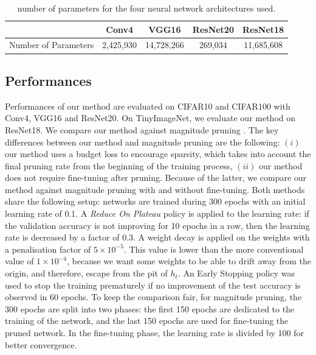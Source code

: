 \begin{table}[ht]
  \centering
  \begin{tabular}{lcccc}
  \cline{2-5}
                       & \textbf{Conv4}     & \textbf{VGG16}      & \textbf{ResNet20} & \textbf{ResNet18}   \\ \hline
  Number of Parameters & 2,425,930 & 14,728,266 & 269,034  & 11,685,608 \\ \hline
  \end{tabular}
  \caption{ number of parameters for the four neural network architectures used.}
  \label{tab:chap1:networks_size}
\end{table}


\subsection{Performances}
\label{sec:chap1:performances}
Performances of our method are evaluated on CIFAR10 and CIFAR100 with Conv4,
VGG16 and ResNet20. On TinyImageNet, we evaluate our method on ResNet18. We
compare our method against magnitude pruning \cite{DBLP:conf/nips/HanPTD15}. The
key differences between our method and magnitude pruning are the following:
$(i)$ our method uses a budget loss to encourage sparsity, which takes into
account the final pruning rate from the beginning of the training process,
$(ii)$ our method does not require fine-tuning after pruning. Because of the
latter, we compare our method against magnitude pruning with and without
fine-tuning. Both methods share the following setup: networks are trained during
300 epochs with an initial learning rate of 0.1. A {\em Reduce On Plateau}
policy is applied to the learning rate: if the validation accuracy is not
improving for 10 epochs in a row, then the learning rate is decreased by a
factor of 0.3. A weight decay is applied on the weights with a penalisation
factor of $5\times10^{−5}$. This value is lower than the more conventional value
of $1\times10^{-4}$, because we want some weights to be able to drift away from the
origin, and therefore, escape from the pit of $h_t$. An Early Stopping policy was
used to stop the training prematurely if no improvement of the test accuracy is
observed in 60 epochs. To keep the comparison fair, for magnitude pruning, the
300 epochs are split into two phases: the first 150 epochs are dedicated to the
training of the network, and the last 150 epochs are used for fine-tuning the
pruned network. In the fine-tuning phase, the learning rate is divided by 100
for better convergence. \\


